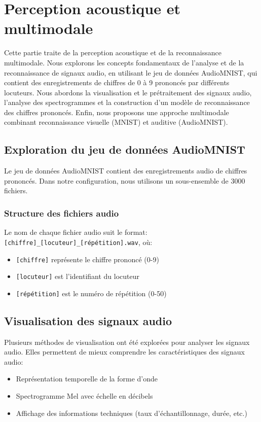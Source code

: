 \documentclass{article}
\begin{document}
\section{Perception acoustique et multimodale}

Cette partie traite de la perception acoustique et de la reconnaissance multimodale. Nous explorons les concepts fondamentaux de l'analyse et de la reconnaissance de signaux audio, en utilisant le jeu de données AudioMNIST, qui contient des enregistrements de chiffres de 0 à 9 prononcés par différents locuteurs. Nous abordons la visualisation et le prétraitement des signaux audio, l'analyse des spectrogrammes et la construction d'un modèle de reconnaissance des chiffres prononcés. Enfin, nous proposons une approche multimodale combinant reconnaissance visuelle (MNIST) et auditive (AudioMNIST).

\subsection{Exploration du jeu de données AudioMNIST}
\label{subsec:exploration}

Le jeu de données AudioMNIST contient des enregistrements audio de chiffres prononcés. Dans notre configuration, nous utilisons un sous-ensemble de 3000 fichiers.

\subsubsection{Structure des fichiers audio}
\label{subsubsec:structure}

Le nom de chaque fichier audio suit le format: \texttt{[chiffre]\_[locuteur]\_[répétition].wav}, où:
\begin{itemize}
    \item \texttt{[chiffre]} représente le chiffre prononcé (0-9)
    \item \texttt{[locuteur]} est l'identifiant du locuteur
    \item \texttt{[répétition]} est le numéro de répétition (0-50)
\end{itemize}
\newpage
\subsection{Visualisation des signaux audio}
\label{sec:visualisation}

Plusieurs méthodes de visualisation ont été explorées pour analyser les signaux audio.
Elles permettent de mieux comprendre les caractéristiques des signaux audio:
\begin{itemize}
    \item Représentation temporelle de la forme d'onde
    \item Spectrogramme Mel avec échelle en décibels
    \item Affichage des informations techniques (taux d'échantillonnage, durée, etc.)
\end{itemize}
\end{document}
